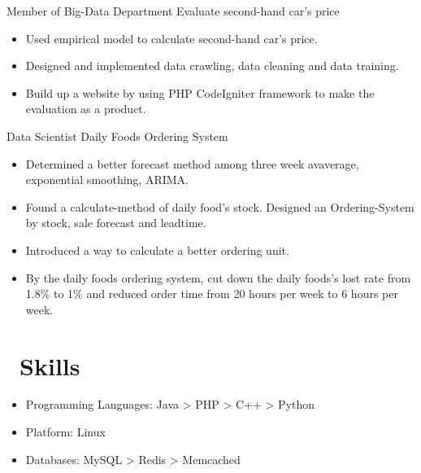 \documentclass{resume}
\begin{document}
Member of Big-Data Department
Evaluate second-hand car's price
\begin{itemize}
  \item Used empirical model to calculate second-hand car's price.
  \item Designed and implemented data crawling, data cleaning and data training. 
  \item Build up a website by using PHP CodeIgniter framework to make the evaluation as a product.
\end{itemize}

Data Scientist
Daily Foods Ordering System
\begin{itemize}
  \item Determined a better forecast method among three week avaverage, exponential smoothing, ARIMA.
  \item Found a calculate-method of daily food’s stock. Designed an Ordering-System by stock, sale forecast and leadtime.
  \item Introduced a way to calculate a better ordering unit.
  \item By the daily foods ordering system, cut down the daily foods's lost rate from 1.8\% to 1\% and reduced order time from 20 hours per week to 6 hours per week.
\end{itemize}

\section{\faCogs\ Skills}
\begin{itemize}[parsep=0.5ex]
  \item Programming Languages: Java > PHP > C++ > Python
  \item Platform: Linux
  \item Databases: MySQL > Redis > Memcached
\end{itemize}
\end{document}
